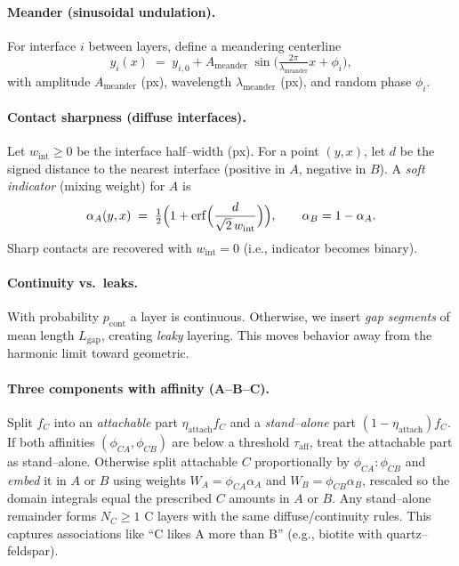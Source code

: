 \documentclass[11pt,a4paper]{article}
\begin{document}
\paragraph{Meander (sinusoidal undulation).} For interface $i$ between layers, define a meandering centerline
\[
    y_i(x) \;=\; y_{i,0} + A_{\text{meander}}\;\sin\!\Big(\tfrac{2\pi}{\lambda_{\text{meander}}}x + \phi_i\Big),
\]
with amplitude $A_{\text{meander}}$ (px), wavelength $\lambda_{\text{meander}}$ (px), and random phase $\phi_i$.

\paragraph{Contact sharpness (diffuse interfaces).} Let $w_{\text{int}}\ge 0$ be the interface half--width (px). For a point $(y,x)$, let $d$ be the signed distance to the nearest interface (positive in $A$, negative in $B$). A \emph{soft indicator} (mixing weight) for $A$ is
\[
    \alpha_A(y,x) \;=\; \tfrac12\Big(1 + \erf\!\Big(\frac{d}{\sqrt{2}\,w_{\text{int}}}\Big)\Big),\qquad \alpha_B=1-\alpha_A.
\]
Sharp contacts are recovered with $w_{\text{int}}=0$ (i.e., indicator becomes binary).

\paragraph{Continuity vs.\ leaks.} With probability $p_{\text{cont}}$ a layer is continuous. Otherwise, we insert \emph{gap segments} of mean length $L_{\text{gap}}$, creating \emph{leaky} layering. This moves behavior away from the harmonic limit toward geometric.

\paragraph{Three components with affinity (A--B--C).} Split $f_C$ into an \emph{attachable} part $\eta_{\text{attach}}f_C$ and a \emph{stand--alone} part $(1-\eta_{\text{attach}})f_C$. If both affinities $(\phi_{CA},\phi_{CB})$ are below a threshold $\tau_{\text{aff}}$, treat the attachable part as stand--alone. Otherwise split attachable $C$ proportionally by $\phi_{CA}\!:\!\phi_{CB}$ and \emph{embed} it in $A$ or $B$ using weights $W_A=\phi_{CA}\alpha_A$ and $W_B=\phi_{CB}\alpha_B$, rescaled so the domain integrals equal the prescribed $C$ amounts in $A$ or $B$. Any stand--alone remainder forms $N_C\!\ge\!1$ C layers with the same diffuse/continuity rules. This captures associations like “C likes A more than B” (e.g., biotite with quartz--feldspar).
\end{document}

